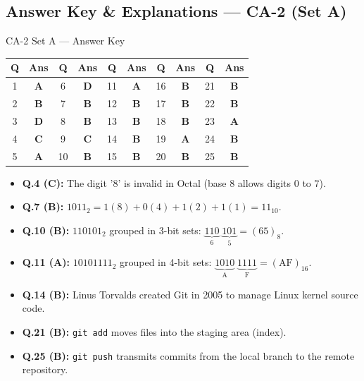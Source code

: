 \newpage
\subsection*{Answer Key \& Explanations --- CA-2 (Set A)}

\begin{answerkeytable}{CA-2 Set A --- Answer Key}
\begin{tabular}{*{10}{c}}
\toprule
\textbf{Q} & \textbf{Ans} & \textbf{Q} & \textbf{Ans} & \textbf{Q} & \textbf{Ans} & \textbf{Q} & \textbf{Ans} & \textbf{Q} & \textbf{Ans} \\
\midrule
1 & \textbf{A} & 6 & \textbf{D} & 11 & \textbf{A} & 16 & \textbf{B} & 21 & \textbf{B} \\
2 & \textbf{B} & 7 & \textbf{B} & 12 & \textbf{B} & 17 & \textbf{B} & 22 & \textbf{B} \\
3 & \textbf{D} & 8 & \textbf{B} & 13 & \textbf{B} & 18 & \textbf{B} & 23 & \textbf{A} \\
4 & \textbf{C} & 9 & \textbf{C} & 14 & \textbf{B} & 19 & \textbf{A} & 24 & \textbf{B} \\
5 & \textbf{A} & 10 & \textbf{B} & 15 & \textbf{B} & 20 & \textbf{B} & 25 & \textbf{B} \\
\bottomrule
\end{tabular}
\end{answerkeytable}

\begin{expbox}
\begin{itemize}[leftmargin=5mm]
    \item \textbf{Q.4 (C):} The digit '$8$' is invalid in Octal (base 8 allows digits $0$ to $7$).
    \item \textbf{Q.7 (B):} $1011_2 = 1(8) + 0(4) + 1(2) + 1(1) = 11_{10}$.
    \item \textbf{Q.10 (B):} $110101_2$ grouped in 3-bit sets: $\underbrace{110}_{6}\;\underbrace{101}_{5} = (65)_8$.
    \item \textbf{Q.11 (A):} $10101111_2$ grouped in 4-bit sets: $\underbrace{1010}_{\text{A}}\;\underbrace{1111}_{\text{F}} = (\text{AF})_{16}$.
    \item \textbf{Q.14 (B):} Linus Torvalds created Git in 2005 to manage Linux kernel source code.
    \item \textbf{Q.21 (B):} \texttt{git add} moves files into the staging area (index).
    \item \textbf{Q.25 (B):} \texttt{git push} transmits commits from the local branch to the remote repository.
\end{itemize}
\end{expbox}

\newpage
